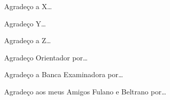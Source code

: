 Agradeço a X…

Agradeço Y…

Agradeço a Z…

Agradeço Orientador por…

Agradeço a Banca Examinadora por…

Agradeço aos meus Amigos Fulano e Beltrano por…
